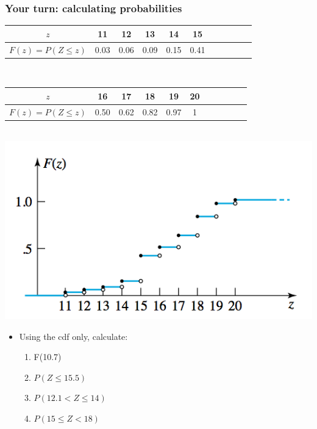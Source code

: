 \documentclass[handout]{beamer}\usepackage{graphicx, color}
\providecommand{\q}{$\quad$ \newline}
\numberwithin{equation}{section}
\begin{document}
\begin{frame}
\frametitle{Your turn: calculating probabilities} \scriptsize

\begin{center}
\begin{tabular}{ccccccccccc}
$z$ & 11 & 12 & 13 & 14 & 15 \\ \hline
$F(z) = P(Z \le z)$ & 0.03 & 0.06 & 0.09 & 0.15 & 0.41
\end{tabular} \q

\begin{tabular}{ccccccccccc}
$z$ & 16 & 17 & 18 & 19 & 20 \\ \hline
$F(z) = P(Z \le z)$ &  0.50 & 0.62 & 0.82 & 0.97 & 1 
\end{tabular} \q 
{} \includegraphics{../../fig/torquez.png}
\end{center}

\begin{itemize}
\item Using the cdf only, calculate:
\begin{enumerate}[1. ]
\item F(10.7)
\item $P(Z \le 15.5)$
\item $P( 12.1 < Z \le 14)$
\item $P( 15 \le Z <  18)$
\end{enumerate}
\end{itemize}
\end{frame}
\end{document}
